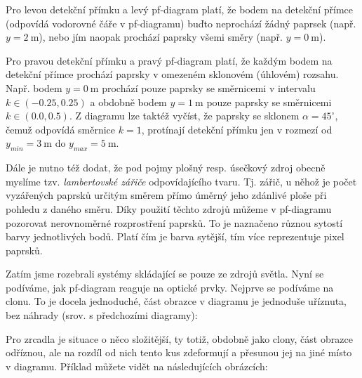 
Pro levou detekční přímku a levý pf-diagram platí, že bodem na detekční přímce (odpovídá vodorovné čáře v pf-diagramu) buďto neprochází žádný paprsek (např. $y = 2\ \mathrm{m}$), nebo jím naopak prochází paprsky všemi směry (např. $y = 0\ \mathrm{m}$).

Pro pravou detekční přímku a pravý pf-diagram platí, že každým bodem na detekční přímce prochází paprsky v omezeném sklonovém (úhlovém) rozsahu. Např. bodem $y = 0\ \mathrm{m}$ prochází pouze paprsky se směrnicemi v intervalu $k \in (-0.25, 0.25)$ a obdobně bodem $y = 1\ \mathrm{m}$ pouze paprsky se směrnicemi $k \in (0.0, 0.5)$. Z diagramu lze taktéž vyčíst, že paprsky se sklonem $\alpha = 45^{\circ}$, čemuž odpovídá směrnice $k = 1$, protínají detekční přímku jen v rozmezí od $y_{min} = 3\ \mathrm{m}$ do $y_{max} = 5\ \mathrm{m}$.

Dále je nutno též dodat, že pod pojmy plošný resp. úsečkový zdroj obecně myslíme tzv. \emph{lambertovské zářiče} odpovídajícího tvaru. Tj. zářič, u něhož je počet vyzářených paprsků určitým směrem přímo úměrný jeho zdánlivé ploše při pohledu z daného směru. Díky použití těchto zdrojů můžeme v pf-diagramu pozorovat nerovnoměrné rozprostření paprsků. To je naznačeno různou sytostí barvy jednotlivých bodů. Platí čím je barva sytější, tím více reprezentuje pixel paprsků.

Zatím jsme rozebrali systémy skládající se pouze ze zdrojů světla. Nyní se podíváme, jak pf-diagram reaguje na optické prvky. Nejprve se podíváme na clonu. To je docela jednoduché, část obrazce v diagramu je jednoduše uříznuta, bez náhrady (srov. s předchozími diagramy):


Pro zrcadla je situace o něco složitější, ty totiž, obdobně jako clony, část obrazce odříznou, ale na rozdíl od nich tento kus zdeformují a přesunou jej na jiné místo v diagramu. Příklad můžete vidět na následujících obrázcích:

